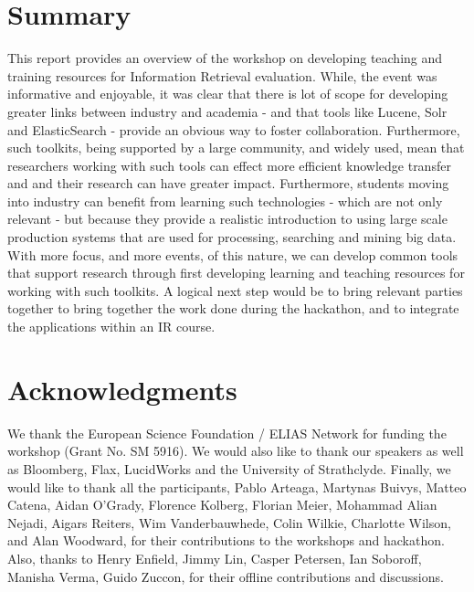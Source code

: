 \documentclass[12pt]{article}
\begin{document}
\begin{sloppypar}







\section{Summary}
This report provides an overview of the workshop on developing teaching and training resources for Information Retrieval evaluation. While, the event was informative and enjoyable, it was clear that there is lot of scope for developing greater links between industry and academia - and that tools like Lucene, Solr and ElasticSearch - provide an obvious way to foster collaboration. Furthermore, such toolkits, being supported by a large community, and widely used, mean that researchers working with such tools can effect more efficient knowledge transfer and and their research can have greater impact. Furthermore, students moving into industry can benefit from learning such technologies - which are not only relevant - but because they provide a realistic introduction to using large scale production systems that are used for processing, searching and mining big data. With more focus, and more events, of this nature, we can develop common tools that support research through first developing learning and teaching resources for working with such toolkits. A logical next step would be to bring relevant parties together to bring together the work done during the hackathon, and to integrate the applications within an IR course.

\section{Acknowledgments}
We thank the European Science Foundation / ELIAS Network for funding the workshop (Grant No. SM 5916). We would also like to thank our speakers as well as Bloomberg, Flax, LucidWorks and the University of Strathclyde. 
Finally, we would like to thank all the participants, 
Pablo Arteaga,
Martynas Buivys, 
Matteo Catena, 
Aidan O'Grady, 
Florence Kolberg, 
Florian Meier,  
Mohammad Alian Nejadi,
Aigars Reiters, 
Wim Vanderbauwhede, 
Colin Wilkie,   
Charlotte Wilson, and 
Alan Woodward, 
for their contributions to the workshops and hackathon. Also, thanks to Henry Enfield, Jimmy Lin, Casper Petersen, Ian Soboroff, Manisha Verma, Guido Zuccon, for their offline contributions and discussions.



{}


%
\end{sloppypar}
\end{document}
